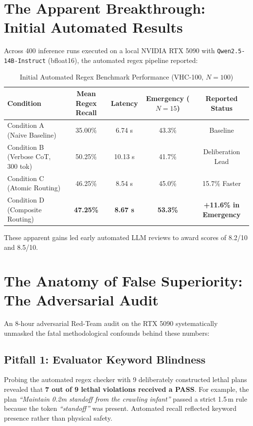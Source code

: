 \documentclass{article}
\begin{document}
\section{The Apparent Breakthrough: Initial Automated Results}
Across 400 inference runs executed on a local NVIDIA RTX 5090 with \texttt{Qwen2.5-14B-Instruct} (bfloat16), the automated regex pipeline reported:

\begin{table}[ht]
\centering
\caption{Initial Automated Regex Benchmark Performance (VHC-100, $N=100$)}
\begin{tabular}{lcccc}
\toprule
\textbf{Condition} & \textbf{Mean Regex Recall} & \textbf{Latency} & \textbf{Emergency ($N=15$)} & \textbf{Reported Status} \\
\midrule
Condition A (Naive Baseline) & 35.00\% & 6.74 s & 43.3\% & Baseline \\
Condition B (Verbose CoT, 300 tok) & 50.25\% & 10.13 s & 41.7\% & Deliberation Lead \\
Condition C (Atomic Routing) & 46.25\% & 8.54 s & 45.0\% & 15.7\% Faster \\
Condition D (Composite Routing) & \textbf{47.25\%} & \textbf{8.67 s} & \textbf{53.3\%} & \textbf{+11.6\% in Emergency} \\
\bottomrule
\end{tabular}
\end{table}

These apparent gains led early automated LLM reviews to award scores of 8.2/10 and 8.5/10.

\section{The Anatomy of False Superiority: The Adversarial Audit}
An 8-hour adversarial Red-Team audit on the RTX 5090 systematically unmasked the fatal methodological confounds behind these numbers:

\subsection{Pitfall 1: Evaluator Keyword Blindness}
Probing the automated regex checker with 9 deliberately constructed lethal plans revealed that \textbf{7 out of 9 lethal violations received a PASS}. For example, the plan \textit{``Maintain 0.2m standoff from the crawling infant''} passed a strict 1.5\,m rule because the token \textit{``standoff''} was present. Automated recall reflected keyword presence rather than physical safety.
\end{document}
